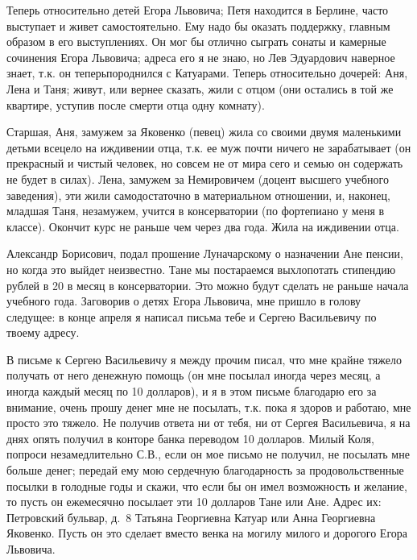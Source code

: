 Теперь относительно детей Егора Львовича; Петя находится в Берлине, часто
выступает и живет самостоятельно. Ему надо бы оказать поддержку, главным
образом в его выступлениях. Он мог бы отлично сыграть сонаты и камерные
сочинения Егора Львовича; адреса его я не знаю, но Лев Эдуардович наверное
знает, т.к. он теперьпороднился с Катуарами. Теперь относительно дочерей: Аня,
Лена и Таня; живут, или вернее сказать, жили с отцом (они остались в той же
квартире, уступив после смерти отца одну комнату).


Старшая, Аня, замужем за Яковенко (певец) жила со своими двумя маленькими
детьми всецело на иждивении отца, т.к. ее муж почти ничего не зарабатывает (он
прекрасный и чистый человек, но совсем не от мира сего и семью он содержать не
будет в силах). Лена, замужем за Немировичем (доцент высшего учебного
заведения), эти жили самодостаточно в материальном отношении, и, наконец,
младшая Таня, незамужем, учится в консерватории (по фортепиано у меня в
классе). Окончит курс не раньше чем через два года. Жила на иждивении отца.

Александр Борисович, подал прошение Луначарскому о назначении Ане пенсии, но
когда это выйдет неизвестно. Тане мы постараемся выхлопотать стипендию рублей в
20 в месяц в консерватории. Это можно будут сделать не раньше начала учебного
года. Заговорив о детях Егора Львовича, мне пришло в голову следущее: в конце
апреля я написал письма тебе и Сергею Васильевичу по твоему адресу.


В письме к Сергею Васильевичу я между прочим писал, что мне крайне тяжело
получать от него денежную помощь (он мне посылал иногда через месяц, а иногда
каждый месяц по 10 долларов), и я в этом письме благодарю его за внимание,
очень прошу денег мне не посылать, т.к. пока я здоров и работаю, мне просто это
тяжело. Не получив ответа ни от тебя, ни от Сергея Васильевича, я на днях опять
получил в конторе банка переводом 10 долларов. Милый Коля, попроси
незамедлительно С.В., если он мое письмо не получил, не посылать мне больше
денег; передай ему мою сердечную благодарность за продовольственные посылки в
голодные годы и скажи, что если бы он имел возможность и желание, то пусть он
ежемесячно посылает эти 10 долларов Тане или Ане. Адрес их: Петровский бульвар,
д.~8 Татьяна Георгиевна Катуар или Анна Георгиевна Яковенко. Пусть он это
сделает вместо венка на могилу милого и дорогого Егора Львовича.

